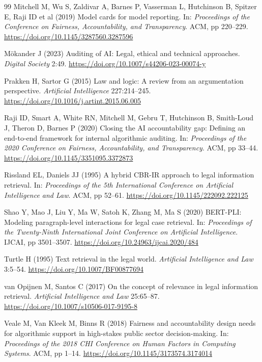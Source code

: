 \documentclass[12pt,a4paper]{article}
\begin{document}
\begin{thebibliography}{99}
Mitchell M, Wu S, Zaldivar A, Barnes P, Vasserman L, Hutchinson B, Spitzer E, Raji ID et al (2019) Model cards for model reporting. In: \textit{Proceedings of the Conference on Fairness, Accountability, and Transparency}. ACM, pp 220--229. \url{https://doi.org/10.1145/3287560.3287596}

Mökander J (2023) Auditing of AI: Legal, ethical and technical approaches. \textit{Digital Society} 2:49. \url{https://doi.org/10.1007/s44206-023-00074-y}

Prakken H, Sartor G (2015) Law and logic: A review from an argumentation perspective. \textit{Artificial Intelligence} 227:214--245. \url{https://doi.org/10.1016/j.artint.2015.06.005}

Raji ID, Smart A, White RN, Mitchell M, Gebru T, Hutchinson B, Smith-Loud J, Theron D, Barnes P (2020) Closing the AI accountability gap: Defining an end-to-end framework for internal algorithmic auditing. In: \textit{Proceedings of the 2020 Conference on Fairness, Accountability, and Transparency}. ACM, pp 33--44. \url{https://doi.org/10.1145/3351095.3372873}

Rissland EL, Daniels JJ (1995) A hybrid CBR-IR approach to legal information retrieval. In: \textit{Proceedings of the 5th International Conference on Artificial Intelligence and Law}. ACM, pp 52--61. \url{https://doi.org/10.1145/222092.222125}

Shao Y, Mao J, Liu Y, Ma W, Satoh K, Zhang M, Ma S (2020) BERT-PLI: Modeling paragraph-level interactions for legal case retrieval. In: \textit{Proceedings of the Twenty-Ninth International Joint Conference on Artificial Intelligence}. IJCAI, pp 3501--3507. \url{https://doi.org/10.24963/ijcai.2020/484}

Turtle H (1995) Text retrieval in the legal world. \textit{Artificial Intelligence and Law} 3:5--54. \url{https://doi.org/10.1007/BF00877694}

van Opijnen M, Santos C (2017) On the concept of relevance in legal information retrieval. \textit{Artificial Intelligence and Law} 25:65--87. \url{https://doi.org/10.1007/s10506-017-9195-8}

Veale M, Van Kleek M, Binns R (2018) Fairness and accountability design needs for algorithmic support in high-stakes public sector decision-making. In: \textit{Proceedings of the 2018 CHI Conference on Human Factors in Computing Systems}. ACM, pp 1--14. \url{https://doi.org/10.1145/3173574.3174014}


\end{thebibliography}
\end{document}
